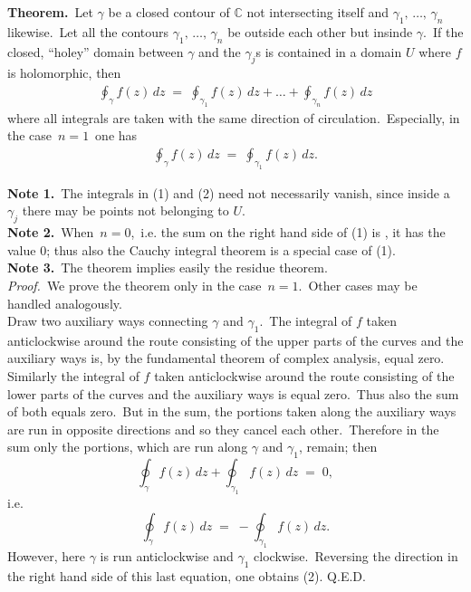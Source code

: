 \documentclass[12pt]{article}
\begin{document}
\textbf{Theorem.}\, Let $\gamma$ be a closed contour of $\mathbb{C}$ not intersecting itself and 
$\gamma_1,\,\ldots,\,\gamma_n$ likewise.\, Let all the contours $\gamma_1,\,\ldots,\,\gamma_n$ be outside each other but insinde $\gamma$.\, If the closed, ``holey'' domain between $\gamma$ and the $\gamma_j$s is contained in a domain 
$U$ where $f$ is holomorphic, then 
\begin{align}
\oint_\gamma\!f(z)\,dz \;=\; \oint_{\gamma_1}\!f(z)\,dz+\ldots+\oint_{\gamma_n}\!f(z)\,dz
\end{align}
where all integrals are taken with the same direction of circulation.\, Especially, in the case \,$n = 1$\, one has
\begin{align}
\oint_\gamma\!f(z)\,dz \;=\; \oint_{\gamma_1}\!f(z)\,dz.
\end{align}

\textbf{Note 1.}\, The integrals in (1) and (2) need not necessarily vanish, since inside a $\gamma_j$ there may be points not belonging to $U$.\\

\textbf{Note 2.}\, When\, $n = 0$,\, i.e. the sum on the right hand side of (1) is , it has the value 0; thus also the Cauchy integral theorem is a special case of (1).\\

\textbf{Note 3.}\, The theorem implies easily the residue theorem.\\

\emph{Proof.}\, We prove the theorem only in the case\, $n = 1$.\, Other cases may be handled analogously.\\
Draw two auxiliary ways connecting $\gamma$ and $\gamma_1$.\, The integral of $f$ taken anticlockwise around the route consisting of the upper parts of the curves and the auxiliary ways is, by the fundamental theorem of complex analysis, equal zero.\, Similarly the integral of $f$ taken anticlockwise around the route consisting of the lower parts of the curves and the auxiliary ways is equal zero.\, Thus also the sum of both equals zero.\, But in the sum, the portions taken along the auxiliary ways are run in opposite directions and so they cancel each other.\, Therefore in the sum only the portions, which are run along $\gamma$ and $\gamma_1$, remain; then
$$\oint_\gamma\!f(z)\,dz+\oint_{\gamma_1}\!f(z)\,dz \;=\; 0,$$
i.e.
$$\oint_\gamma\!f(z)\,dz \;=\; -\oint_{\gamma_1}\!f(z)\,dz.$$
However, here $\gamma$ is run anticlockwise and $\gamma_1$ clockwise.\, Reversing the direction in the right hand side of this last equation, one obtains (2). Q.E.D.
\end{document}
